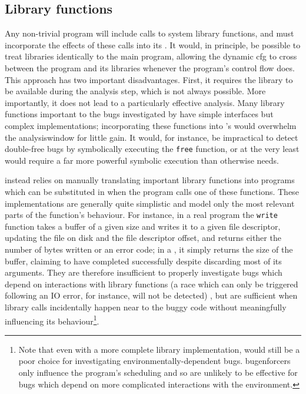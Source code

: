 \subsection{Library functions}
\label{sect:derive:library_functions}

Any non-trivial program will include calls to system library
functions, and {\technique} must incorporate the effects of these
calls into its {\StateMachines}.  It would, in principle, be possible
to treat libraries identically to the main program, allowing the
dynamic \gls{cfg} to cross between the program and its libraries
whenever the program's control flow does.  This approach has two
important disadvantages.  First, it requires the library to be
available during the analysis step, which is not always possible.
More importantly, it does not lead to a particularly effective
analysis.  Many library functions important to the bugs investigated
by {\technique} have simple interfaces but complex implementations;
incorporating these functions into {\technique}'s {\StateMachines}
would overwhelm the \gls{analysiswindow} for little gain.  It would,
for instance, be impractical to detect double-free bugs by
symbolically executing the \texttt{free} function, or at the very
least would require a far more powerful symbolic execution than
{\technique} otherwise needs.

{\Technique} instead relies on manually translating important library
functions into {\StateMachine} programs which can be substituted in
when the program calls one of these functions.  These implementations
are generally quite simplistic and model only the most relevant parts
of the function's behaviour.  For instance, in a real program the
\texttt{write} function takes a buffer of a given size and writes it
to a given file descriptor, updating the file on disk and the file
descriptor offset, and returns either the number of bytes written or
an error code; in a {\technique} {\StateMachine}, it simply returns
the size of the buffer, claiming to have completed successfully
despite discarding most of its arguments.  They are therefore
insufficient to properly investigate bugs which depend on interactions
with library functions (a race which can only be triggered following
an IO error, for instance, will not be detected) , but are sufficient
when library calls incidentally happen near to the buggy code without
meaningfully influencing its behaviour\footnote{Note that even with a
  more complete {\StateMachine} library implementation, {\technique}
  would still be a poor choice for investigating
  environmentally-dependent bugs.  \protect\Glspl{bugenforcer} only
  influence the program's scheduling and so are unlikely to be
  effective for bugs which depend on more complicated interactions
  with the environment.}.

